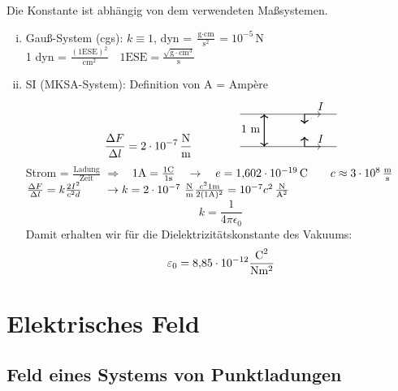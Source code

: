 Die Konstante ist abhängig von dem verwendeten Maßsystemen.
\begin{enumerate}[i)]
	\item Gauß-System (cgs): $k \equiv 1$, dyn = $\frac{\textrm{g}\cdot \textrm{cm}}{\textrm{s}^2} = 10^{-5}\,\textrm{N}$\\
	1 dyn = $\frac{(1\textrm{ESE})^2}{\textrm{cm}^2} \quad 1\textrm{ESE} = \frac{\sqrt{\textrm{g}\cdot \textrm{cm}^3}}{\textrm{s}}$
	\item SI (MKSA-System): Definition von A = Amp\`ere 
	\vspace{-15pt}
	$$\frac{\Delta F}{\Delta l}= 2 \cdot 10^{-7}\,\frac{\textrm{N}}{\textrm{m}} \qquad \qquad \begin{tikzpicture}
	\draw (0,0) -- (3,0);
	\draw (0,1) -- (3,1);
	\draw[thick,<->] (.75,0) -- (.75,1) node[anchor=north east,yshift=-6pt] {1 m};
	\draw[thick,->] (2,0) -- (2,.3);
	\draw[thick,->] (2,1) -- (2,.7);
	\draw[->] (2,0) -- (2.5,0) node[above] {$ I $};
	\draw[->] (2,1) -- (2.5,1) node[above] {$ I $};
	\end{tikzpicture}$$
	Strom = $\frac{\textrm{Ladung}}{\textrm{Zeit}}$ $\Rightarrow$  \ 
	$
	1 \textrm{A} = \frac{1 \textrm{C}}{1 \textrm{s}} \quad \rightarrow \quad e = 1{,}602 \cdot 10^{-19} \, \textrm{C} \qquad c \approx 3 \cdot 10^{8} \, \frac{\textrm{m}}{\textrm{s}}
	$\\[5pt]
	$
	\frac{\Delta F}{\Delta l} = k \frac{2 I^2}{c^2 d} \qquad \rightarrow k = 2 \cdot 10^{-7} \ \frac{\tx{N}}{\tx{m}} \frac{c^2 1 \tx{m}}{2 (1 \tx{A})^2} = 10^{-7} c^2 \, \frac{\tx{N}}{\tx{A}^2}
	$
	\begin{equation*}
	k = \frac{1}{4 \pi \epsilon_0}
	\end{equation*}
	Damit erhalten wir für die Dielektrizitätskonstante des Vakuums:
	\begin{equation*}
	\varepsilon_0 = 8{,}85 \cdot 10^{-12} \frac{\textrm{C}^2}{\textrm{N} \textrm{m}^2}
	\end{equation*}
\end{enumerate}

\section{Elektrisches Feld}
\subsection{Feld eines Systems von Punktladungen}

